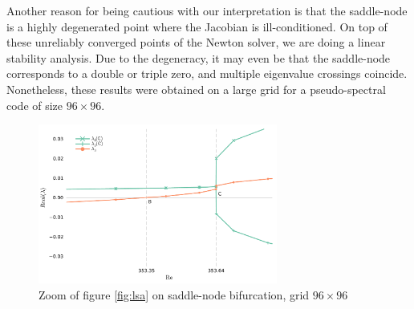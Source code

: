 Another reason for being cautious with our interpretation is that the
saddle-node is a highly degenerated point where the Jacobian is
ill-conditioned. On top of these unreliably converged points of the Newton
solver, we are doing a linear stability analysis. Due to the degeneracy, it may
even be that the saddle-node corresponds to a double or triple zero, and
multiple eigenvalue crossings coincide. Nonetheless, these results were
obtained on a large grid for a pseudo-spectral code of size $96 \times 96$.

\begin{figure}[h!]
  \centering
  \includegraphics[width=0.7\textwidth]{figs/lsa_sn_zoom96x96.pdf}
  \caption{Zoom of figure \ref{fig:lsa} on saddle-node bifurcation, grid $96
    \times 96$} 
  \label{fig:lsa_zoom}
\end{figure}

